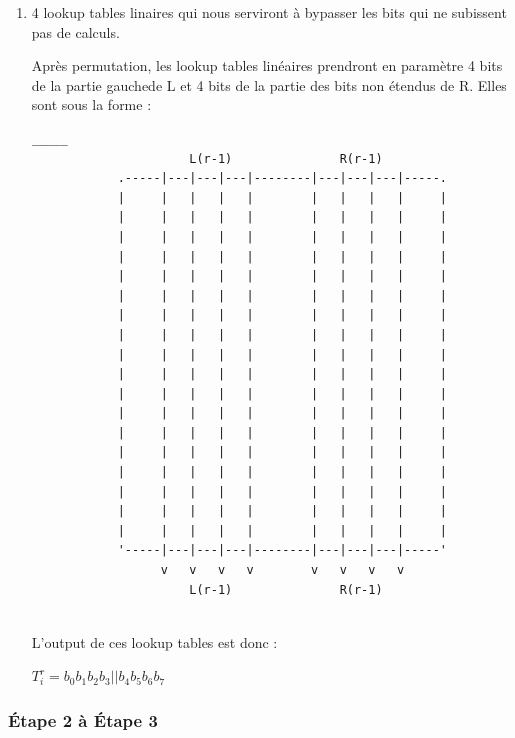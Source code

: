 \documentclass[a4paper,12pt]{article}
\begin{document}
\begin{enumerate}
\item 4 lookup tables linaires qui nous serviront à bypasser les bits qui ne subissent pas de calculs.

Après permutation, les lookup tables linéaires prendront en paramètre 4 bits de la partie gauchede L et 4 bits de la partie des bits non étendus de R. Elles sont sous la forme :

\begin{Verbatim}[samepage=true]
                                           _____
                      L(r-1)               R(r-1)
            .-----|---|---|---|--------|---|---|---|-----.
            |     |   |   |   |        |   |   |   |     |
            |     |   |   |   |        |   |   |   |     |
            |     |   |   |   |        |   |   |   |     |  
            |     |   |   |   |        |   |   |   |     | 
            |     |   |   |   |        |   |   |   |     |
            |     |   |   |   |        |   |   |   |     |
            |     |   |   |   |        |   |   |   |     |
            |     |   |   |   |        |   |   |   |     | 
            |     |   |   |   |        |   |   |   |     | 
            |     |   |   |   |        |   |   |   |     | 
            |     |   |   |   |        |   |   |   |     |             
            |     |   |   |   |        |   |   |   |     |              
            |     |   |   |   |        |   |   |   |     |             
            |     |   |   |   |        |   |   |   |     |               
            |     |   |   |   |        |   |   |   |     |                
            |     |   |   |   |        |   |   |   |     |     
            |     |   |   |   |        |   |   |   |     | 
            |     |   |   |   |        |   |   |   |     |  
            '-----|---|---|---|--------|---|---|---|-----'
                  v   v   v   v        v   v   v   v 
                      L(r-1)               R(r-1)
 
\end{Verbatim}	

L'output de ces lookup tables est donc :
\medskip
\begin{center}
$T_i^r = b_0 b_1 b_2 b_3||b_4 b_5 b_6 b_7$
\end{center}
\medskip
\end{enumerate}



		
\subsubsection{Étape 2 à Étape 3}
\end{document}
